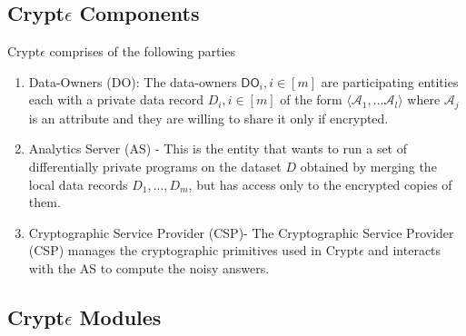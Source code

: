 \subsection{Crypt$\epsilon$ Components}
Crypt$\epsilon$ comprises of the following parties\begin{enumerate}
 \item Data-Owners (\textsf{DO}): The data-owners $\textsf{DO}_i, i \in [m]$ are participating entities each with a
private data record $D_i, i \in [m]$ of the form $\langle \mathcal{A}_1,...\mathcal{A}_l\rangle$ where $\mathcal{A}_j$ is an attribute and they are willing to share it only if encrypted.    \item Analytics Server (\textsf{AS}) - This is the entity that wants to run a set of differentially private programs on the dataset $D$ obtained by merging the local data records $D_1, ... , D_m$, but has
access only to the encrypted copies of them. 
\item Cryptographic Service Provider (\textsf{CSP})-
 The Cryptographic Service Provider (\textsf{CSP}) manages the cryptographic primitives used in Crypt$\epsilon$ and interacts with the \textsf{AS} to compute the
noisy answers. 
\end{enumerate}
\subsection{Crypt$\epsilon$ Modules}

